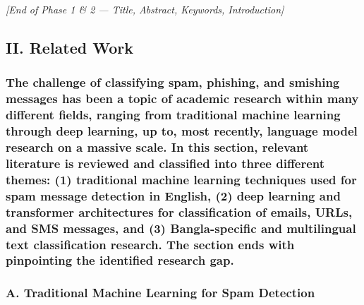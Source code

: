 \emph{{[}End of Phase 1 \& 2 --- Title, Abstract, Keywords,
Introduction{]}}

\subsection{II. Related Work}\label{ii.-related-work}

\subsubsection{The challenge of classifying spam, phishing, and smishing
messages has been a topic of academic research within many different
fields, ranging from traditional machine learning through deep learning,
up to, most recently, language model research on a massive scale. In
this section, relevant literature is reviewed and classified into three
different themes: (1) traditional machine learning techniques used for
spam message detection in English, (2) deep learning and transformer
architectures for classification of emails, URLs, and SMS messages, and
(3) Bangla-specific and multilingual text classification research. The
section ends with pinpointing the identified research
gap.}\label{the-challenge-of-classifying-spam-phishing-and-smishing-messages-has-been-a-topic-of-academic-research-within-many-different-fields-ranging-from-traditional-machine-learning-through-deep-learning-up-to-most-recently-language-model-research-on-a-massive-scale.-in-this-section-relevant-literature-is-reviewed-and-classified-into-three-different-themes-1-traditional-machine-learning-techniques-used-for-spam-message-detection-in-english-2-deep-learning-and-transformer-architectures-for-classification-of-emails-urls-and-sms-messages-and-3-bangla-specific-and-multilingual-text-classification-research.-the-section-ends-with-pinpointing-the-identified-research-gap.}

\subsubsection{A. Traditional Machine Learning for Spam
Detection}\label{a.-traditional-machine-learning-for-spam-detection}

